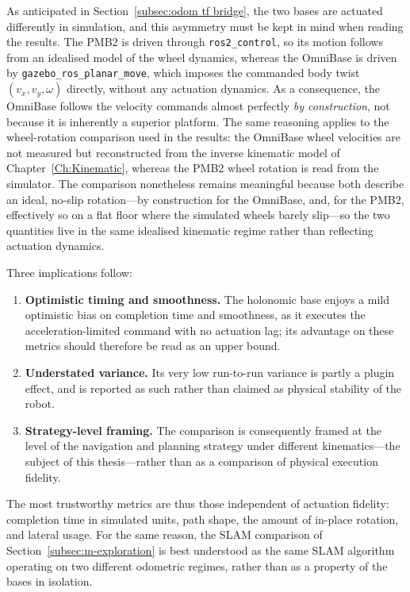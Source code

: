 As anticipated in Section~\ref{subsec:odom tf bridge}, the two bases are actuated differently in simulation, and this asymmetry must be kept in mind when reading the results. The PMB2 is driven through \texttt{ros2\_control}, so its motion follows from an idealised model of the wheel dynamics, whereas the OmniBase is driven by \texttt{gazebo\_ros\_planar\_move}, which imposes the commanded body twist $(v_x, v_y, \omega)$ directly, without any actuation dynamics. As a consequence, the OmniBase follows the velocity commands almost perfectly \emph{by construction}, not because it is inherently a superior platform. The same reasoning applies to the wheel-rotation comparison used in the results: the OmniBase wheel velocities are not measured but reconstructed from the inverse kinematic model of Chapter~\ref{Ch:Kinematic}, whereas the PMB2 wheel rotation is read from the simulator. The comparison nonetheless remains meaningful because both describe an ideal, no-slip rotation---by construction for the OmniBase, and, for the PMB2, effectively so on a flat floor where the simulated wheels barely slip---so the two quantities live in the same idealised kinematic regime rather than reflecting actuation dynamics.

Three implications follow:
\begin{enumerate}
    \item \textbf{Optimistic timing and smoothness.} The holonomic base enjoys a mild optimistic bias on completion time and smoothness, as it executes the acceleration-limited command with no actuation lag; its advantage on these metrics should therefore be read as an upper bound.
    \item \textbf{Understated variance.} Its very low run-to-run variance is partly a plugin effect, and is reported as such rather than claimed as physical stability of the robot.
    \item \textbf{Strategy-level framing.} The comparison is consequently framed at the level of the navigation and planning strategy under different kinematics---the subject of this thesis---rather than as a comparison of physical execution fidelity.
\end{enumerate}
The most trustworthy metrics are thus those independent of actuation fidelity: completion time in simulated units, path shape, the amount of in-place rotation, and lateral usage. For the same reason, the SLAM comparison of Section~\ref{subsec:m-exploration} is best understood as the same SLAM algorithm operating on two different odometric regimes, rather than as a property of the bases in isolation.

